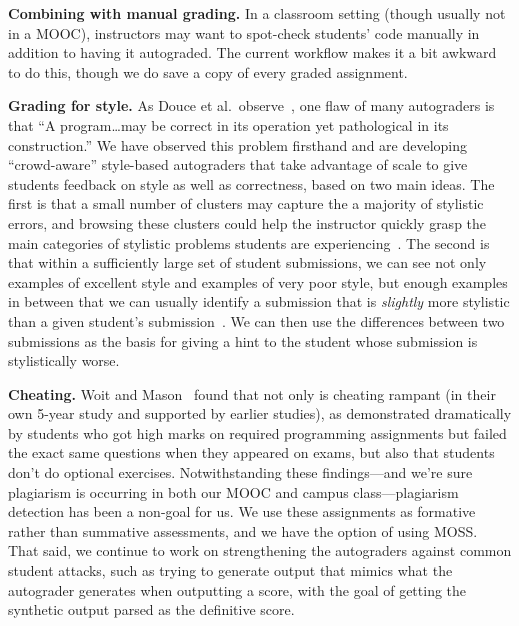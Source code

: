 \textbf{Combining with manual grading.}  In a classroom setting (though
usually not in a MOOC), instructors may want to
spot-check students' code manually  in addition to having it
autograded.  The current workflow makes it a  bit awkward to do this,
though we do save a copy of every graded assignment.

\textbf{Grading for style.}
As Douce et al.\ observe~\cite{douce-2005-autograding-survey}, one flaw
of many autograders is that ``A program\ldots{}may be correct in its
operation yet pathological in its construction.''
We have observed this problem firsthand and are developing
``crowd-aware'' style-based
autograders that take advantage of
scale to give students feedback on style as well as correctness, based
on two main ideas.
The first is that a small number of clusters may capture the
a majority of stylistic errors, and browsing these clusters could help 
the instructor quickly grasp the main categories of stylistic problems students
are experiencing~\cite{clustering-style}.  The second is that within a sufficiently large set of
student submissions, we can see not only examples of excellent style and
examples of very poor style, but enough examples in between that we can
usually identify a submission that is \emph{slightly} more stylistic
than a given student's submission~\cite{autostyle}.  We can then use the differences
between two submissions as the basis for giving a hint to the student
whose submission is stylistically worse.

\textbf{Cheating.}
Woit and Mason~\cite{woit2003} found that not only is cheating rampant
(in their own 5-year study and supported by earlier studies), as
demonstrated dramatically by students who got high marks on required
programming assignments but failed the exact same questions when they
appeared on exams, but also that students don't do optional exercises.
Notwithstanding these findings---and we're sure plagiarism is occurring
in both our MOOC and campus class---plagiarism detection has been a
non-goal for us.
We use these assignments as formative rather than summative assessments,
and we have the option of using
MOSS.
That said, we continue to work on strengthening the autograders against
common student attacks, such as trying to generate output that mimics
what the autograder generates when outputting a score, with the goal of
getting the synthetic output parsed as the definitive score.



